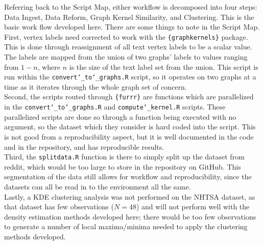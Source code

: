 Referring back to the Script Map, either workflow is decomposed into four steps: Data Ingest, Data Reform, Graph Kernel Similarity, and Clustering. This is the basic work flow developed here. There are some things to note in the Script Map.\\ 

First, vertex labels need corrected to work with the \texttt{\{graphkernels\}} package. This is done through reassignment of all text vertex labels to be a scalar value. The labels are mapped from the union of two graphs' labels to values ranging from $1-n$, where $n$ is the size of the text label set from the union. This script is run within the \texttt{convert\char`_to\char`_graphs.R} script, so it operates on two graphs at a time as it iterates through the whole graph set of concern.\\

Second, the scripts routed through \texttt{\{furrr\}} are functions which are parallelized in the \texttt{convert\char`_to\char`_graphs.R} and \texttt{compute\char`_kernel.R} scripts. These parallelized scripts are done so through a function being executed with no argument, so the dataset which they consider is hard coded into the script. This is not good from a reproducibility aspect, but it is well documented in the code and in the repository, and has reproducible results. \\

Third, the \texttt{splitdata.R} function is there to simply split up the dataset from reddit, which would be too large to store in the repository on GitHub. This segmentation of the data still allows for workflow and reproducibility, since the datasets can all be read in to the environment all the same. \\

Lastly, a KDE clustering analysis was not performed on the NHTSA dataset, as that dataset has few observations ($N=48$) and will not perform well with the density estimation methods developed here; there would be too few observations to generate a number of local maxima/minima needed to apply the clustering methods developed. \\

 